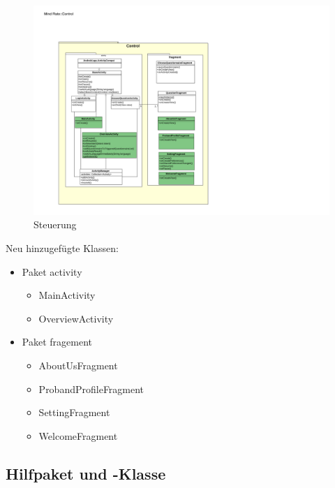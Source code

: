 \documentclass[a4paper]{scrreprt}
\begin{document}
                \vspace*{1cm}
                \begin{figure}[H]
                    \centering
                    \includegraphics[scale = 1.0]{Control.pdf}
                    \caption{Steuerung}
                \end{figure}


                Neu hinzugefügte Klassen:
                \begin{itemize}
                    \item Paket activity
                        \begin{itemize}
                            \item MainActivity
                            \item OverviewActivity
                        \end{itemize}
                    \item Paket fragement
                        \begin{itemize}
                            \item AboutUsFragment
                            \item ProbandProfileFragment
                            \item SettingFragment
                            \item WelcomeFragment
                        \end{itemize}
                \end{itemize}


            \subsection{Hilfpaket und -Klasse}
\end{document}
